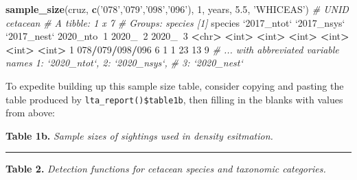\documentclass[
]{book}
\newenvironment{Shaded}{\begin{snugshade}}{\end{snugshade}}
\newcommand{\CommentTok}[1]{\textcolor[rgb]{0.56,0.35,0.01}{\textit{#1}}}
\newcommand{\DataTypeTok}[1]{\textcolor[rgb]{0.13,0.29,0.53}{#1}}
\newcommand{\DecValTok}[1]{\textcolor[rgb]{0.00,0.00,0.81}{#1}}
\newcommand{\ErrorTok}[1]{\textcolor[rgb]{0.64,0.00,0.00}{\textbf{#1}}}
\newcommand{\FloatTok}[1]{\textcolor[rgb]{0.00,0.00,0.81}{#1}}
\newcommand{\KeywordTok}[1]{\textcolor[rgb]{0.13,0.29,0.53}{\textbf{#1}}}
\newcommand{\NormalTok}[1]{#1}
\newcommand{\OperatorTok}[1]{\textcolor[rgb]{0.81,0.36,0.00}{\textbf{#1}}}
\newcommand{\StringTok}[1]{\textcolor[rgb]{0.31,0.60,0.02}{#1}}
\begin{document}
\begin{Shaded}
\begin{Highlighting}[]
\KeywordTok{sample_size}\NormalTok{(cruz, }\KeywordTok{c}\NormalTok{(}\StringTok{'078'}\NormalTok{,}\StringTok{'079'}\NormalTok{,}\StringTok{'098'}\NormalTok{,}\StringTok{'096'}\NormalTok{), }
            \DecValTok{1}\NormalTok{, years, }\FloatTok{5.5}\NormalTok{, }\StringTok{'WHICEAS'}\NormalTok{) }\CommentTok{# UNID cetacean}
\CommentTok{# A tibble: 1 x 7}
\CommentTok{# Groups:   species [1]}
\NormalTok{  species         }\StringTok{`}\DataTypeTok{2017_ntot}\StringTok{`} \StringTok{`}\DataTypeTok{2017_nsys}\StringTok{`} \StringTok{`}\DataTypeTok{2017_nest}\StringTok{`} \DecValTok{2020}\NormalTok{_nto}\OperatorTok{~}\DecValTok{1} \DecValTok{2020}\NormalTok{_}\OperatorTok{~}\DecValTok{2} \DecValTok{2020}\NormalTok{_}\OperatorTok{~}\DecValTok{3}
  \OperatorTok{<}\NormalTok{chr}\OperatorTok{>}\StringTok{                 }\ErrorTok{<}\NormalTok{int}\OperatorTok{>}\StringTok{       }\ErrorTok{<}\NormalTok{int}\OperatorTok{>}\StringTok{       }\ErrorTok{<}\NormalTok{int}\OperatorTok{>}\StringTok{      }\ErrorTok{<}\NormalTok{int}\OperatorTok{>}\StringTok{   }\ErrorTok{<}\NormalTok{int}\OperatorTok{>}\StringTok{   }\ErrorTok{<}\NormalTok{int}\OperatorTok{>}
\DecValTok{1} \DecValTok{078}\OperatorTok{/}\DecValTok{079}\OperatorTok{/}\DecValTok{098}\OperatorTok{/}\DecValTok{096}           \DecValTok{6}           \DecValTok{1}           \DecValTok{1}         \DecValTok{23}      \DecValTok{13}       \DecValTok{9}
\CommentTok{# ... with abbreviated variable names 1: `2020_ntot`, 2: `2020_nsys`,}
\CommentTok{#   3: `2020_nest`}
\end{Highlighting}
\end{Shaded}

To expedite building up this sample size table, consider copying and pasting the table produced by \texttt{lta\_report()\$table1b}, then filling in the blanks with values from above:

\textbf{Table 1b.} \emph{Sample sizes of sightings used in density esitmation.}

\begin{center}\rule{0.5\linewidth}{0.5pt}\end{center}

\textbf{Table 2.} \emph{Detection functions for cetacean species and taxonomic categories.}

\begin{Shaded}
\end{Shaded}
\end{document}
